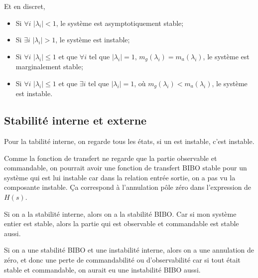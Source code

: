 Et en discret,
\begin{itemize}
  \item Si $\forall i$ $|\lambda_i| < 1$, le système est asymptotiquement
    stable;
  \item Si $\exists i$ $|\lambda_i| > 1$, le système est instable;
  \item Si $\forall i$ $|\lambda_i| \leq 1$ et que $\forall i$ tel que
    $|\lambda_i| = 1$, $m_g(\lambda_i) = m_a(\lambda_i)$,
    le système est marginalement stable;
  \item Si $\forall i$ $|\lambda_i| \leq 1$ et que $\exists i$ tel que
    $|\lambda_i| = 1$, où $m_g(\lambda_i) < m_a(\lambda_i)$,
    le système est instable.
\end{itemize}

\subsection{Stabilité interne et externe}
Pour la tabilité interne, on regarde tous les états,
si un est instable, c'est instable.

Comme la fonction de transfert ne regarde que
la partie observable et commandable,
on pourrait avoir une fonction de transfert
BIBO stable pour un système qui est
lui instable car dans la relation entrée sortie,
on a pas vu la composante instable.
Ça correspond à l'annulation pôle zéro dans l'expression de $H(s)$.

Si on a la stabilité interne, alors on a la stabilité BIBO.
Car si mon système entier est stable,
alors la partie qui est observable et commandable est stable aussi.

Si on a une stabilité BIBO et une instabilité interne,
alors on a une annulation de zéro,
et donc une perte de commandabilité ou d'observabilité
car si tout était stable et commandable,
on aurait eu une instabilité BIBO aussi.

%

